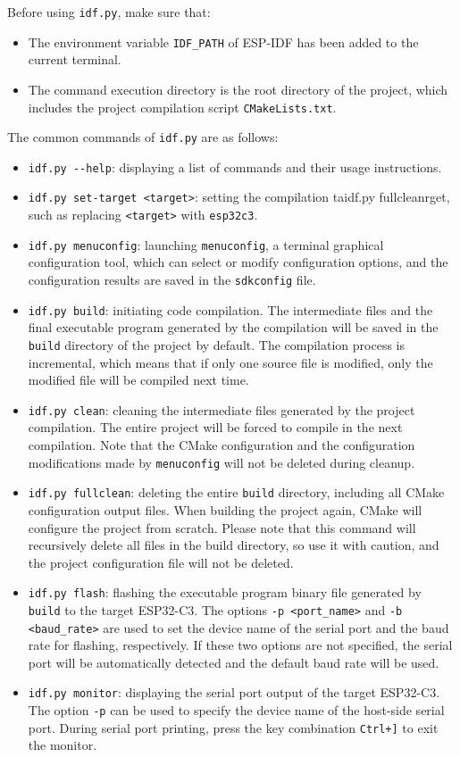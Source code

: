 \documentclass[a4paper,12pt,openany]{book}
\begin{document}
Before using \verb|idf.py|, make sure that:

\begin{itemize}[leftmargin=1.5em, noitemsep]
    \item The environment variable \verb|IDF_PATH| of ESP-IDF has been added to the current terminal.
    \item The command execution directory is the root directory of the project, which includes the project compilation script \verb|CMakeLists.txt|.
\end{itemize}

The common commands of \verb|idf.py| are as follows:

\begin{itemize}[leftmargin=1.5em, noitemsep]
    \item \verb|idf.py --help|: displaying a list of commands and their usage instructions.
    \item \verb|idf.py set-target <target>|: setting the compilation taidf.py fullcleanrget, such as replacing \verb|<target>| with \verb|esp32c3|.
    \item \verb|idf.py menuconfig|: launching \verb|menuconfig|, a terminal graphical configuration tool, which can select or modify configuration options, and the configuration results are saved in the \verb|sdkconfig| file.
    \item \verb|idf.py build|: initiating code compilation. The intermediate files and the final executable program generated by the compilation will be saved in the \verb|build| directory of the project by default. The compilation process is incremental, which means that if only one source file is modified, only the modified file will be compiled next time.
    \item \verb|idf.py clean|: cleaning the intermediate files generated by the project compilation. The entire project will be forced to compile in the next compilation. Note that the CMake configuration and the configuration modifications made by \verb|menuconfig| will not be deleted during cleanup.
    \item \verb|idf.py fullclean|: deleting the entire \verb|build| directory, including all CMake configuration output files. When building the project again, CMake will configure the project from scratch. Please note that this command will recursively delete all files in the build directory, so use it with caution, and the project configuration file will not be deleted.
    \item \verb|idf.py flash|: flashing the executable program binary file generated by \verb|build| to the target ESP32-C3. The options \verb|-p <port_name>| and \verb|-b <baud_rate>| are used to set the device name of the serial port and the baud rate for flashing, respectively. If these two options are not specified, the serial port will be automatically detected and the default baud rate will be used.
    \item \verb|idf.py monitor|: displaying the serial port output of the target ESP32-C3. The option \verb|-p| can be used to specify the device name of the host-side serial port. During serial port printing, press the key combination \verb|Ctrl+]| to exit the monitor.
\end{itemize}
\end{document}
